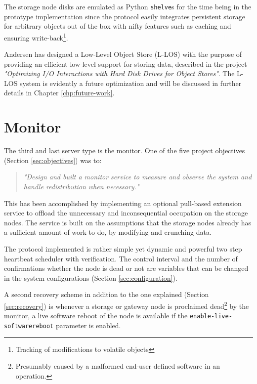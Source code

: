 The storage node disks are emulated as Python \texttt{shelve}s \cite{PageShelve} for the time being in the prototype implementation since the protocol easily integrates persistent storage for arbitrary objects out of the box with nifty features such as caching and ensuring write-back\footnote{Tracking of modifications to volatile objects}.

Andersen has designed a Low-Level Object Store (L-LOS) with the purpose of providing an efficient low-level support for storing data, described in the project \textit{"Optimizing I/O Interactions with Hard Disk Drives for Object Stores"}\cite{andersen2016}. The L-LOS system is evidently a future optimization and will be discussed in further details in Chapter \ref{chp:future-work}. 

\section{Monitor} \label{sec:monitor}
The third and last server type is the monitor. One of the five project objectives (Section \ref{sec:objectives}) was to:

\begin{quotation}
	\textit{"Design and built a monitor service to measure and observe the system and handle redistribution when necessary."}
\end{quotation}

This has been accomplished by implementing an optional pull-based extension service to offload the unnecessary and inconsequential 	occupation on the storage nodes. The service is built on the assumptions that the storage nodes already has a sufficient amount of work to do, by modifying and crunching data.
\newline

The protocol implemented is rather simple yet dynamic and powerful two step heartbeat scheduler with verification. The control interval and the number of confirmations whether the node is dead or not are variables that can be changed in the system configurations (Section \ref{sec:configuration}). 
\newpage

A second recovery scheme in addition to the one explained (Section \ref{sec:recovery}) is whenever a storage or gateway node is proclaimed dead\footnote{Presumably caused by a malformed end-user defined software in an operation.} by the monitor, a live software reboot of the node is available if the \texttt{enable-live-software\-reboot} parameter is enabled.

